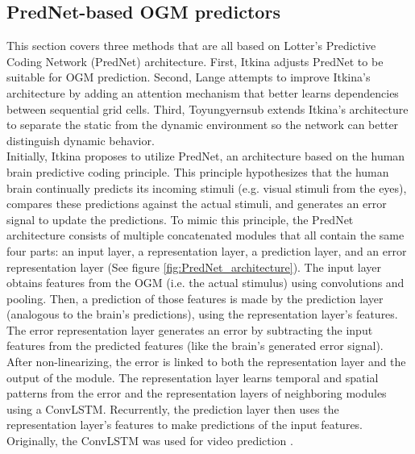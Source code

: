 \subsection{PredNet-based \gls{OGM} predictors} \label{subsec:prednet}
This section covers three methods that are all based on Lotter's \cite{lotter2016deep} Predictive Coding Network (PredNet) architecture. First, Itkina \cite{itkina2019dynamic} adjusts PredNet to be suitable for \gls{OGM} prediction. Second, Lange \cite{lange2020attention} attempts to improve Itkina's \cite{itkina2019dynamic} architecture by adding an attention mechanism that better learns dependencies between sequential grid cells. Third, Toyungyernsub \cite{toyungyernsub2020double} extends Itkina's \cite{itkina2019dynamic} architecture to separate the static from the dynamic environment so the network can better distinguish dynamic behavior.  \\

Initially, Itkina \cite{itkina2019dynamic} proposes to utilize PredNet, an architecture based on the human brain predictive coding principle. This principle hypothesizes that the human brain continually predicts its incoming stimuli (e.g. visual stimuli from the eyes), compares these predictions against the actual stimuli, and generates an error signal to update the predictions. To mimic this principle, the PredNet architecture consists of multiple concatenated modules that all contain the same four parts: an input layer, a representation layer, a prediction layer, and an error representation layer (See figure \ref{fig:PredNet_architecture}). The input layer obtains features from the \gls{OGM} (i.e. the actual stimulus) using convolutions and pooling. Then, a prediction of those features is made by the prediction layer (analogous to the brain's predictions), using the representation layer's features. The error representation layer generates an error by subtracting the input features from the predicted features (like the brain's generated error signal). After non-linearizing, the error is linked to both the representation layer and the output of the module. The representation layer learns temporal and spatial patterns from the error and the representation layers of neighboring modules using a \gls{ConvLSTM}. Recurrently, the prediction layer then uses the representation layer's features to make predictions of the input features. Originally, the \gls{ConvLSTM} was used for video prediction \cite{lotter2016deep}. \\

